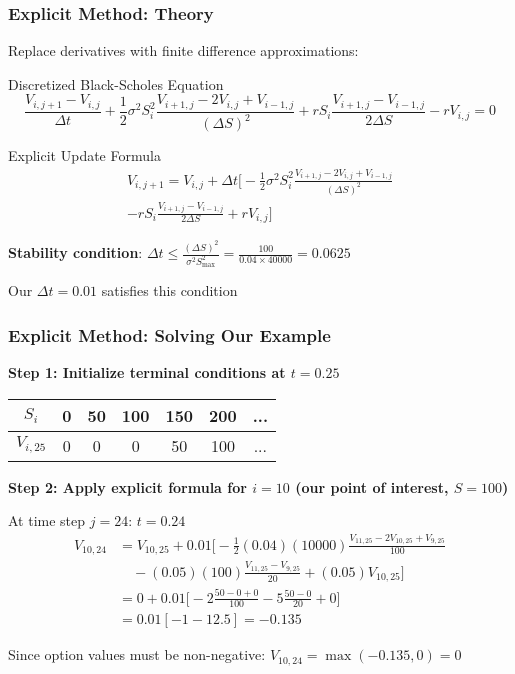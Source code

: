 \documentclass[aspectratio=169]{beamer}
\begin{document}
\begin{frame}
\frametitle{Explicit Method: Theory}
Replace derivatives with finite difference approximations:

\begin{block}{Discretized Black-Scholes Equation}
\[\frac{V_{i,j+1} - V_{i,j}}{\Delta t} + \frac{1}{2}\sigma^2 S_i^2 \frac{V_{i+1,j} - 2V_{i,j} + V_{i-1,j}}{(\Delta S)^2} + rS_i \frac{V_{i+1,j} - V_{i-1,j}}{2\Delta S} - rV_{i,j} = 0\]
\end{block}

\begin{block}{Explicit Update Formula}
\begin{multline}
V_{i,j+1} = V_{i,j} + \Delta t \bigg[ -\frac{1}{2}\sigma^2 S_i^2 \frac{V_{i+1,j} - 2V_{i,j} + V_{i-1,j}}{(\Delta S)^2} \\
- rS_i \frac{V_{i+1,j} - V_{i-1,j}}{2\Delta S} + rV_{i,j} \bigg]
\end{multline}
\end{block}

\textbf{Stability condition}: \(\Delta t \leq \frac{(\Delta S)^2}{\sigma^2 S_{\max}^2} = \frac{100}{0.04 \times 40000} = 0.0625\)

Our \(\Delta t = 0.01\) satisfies this condition \checkmark
\end{frame}

\begin{frame}
\frametitle{Explicit Method: Solving Our Example}
\textbf{Step 1: Initialize terminal conditions at \(t = 0.25\)}
\begin{center}
\begin{tabular}{c|c|c|c|c|c|c}
\(S_i\) & 0 & 50 & 100 & 150 & 200 & ... \\
\hline
\(V_{i,25}\) & 0 & 0 & 0 & 50 & 100 & ...
\end{tabular}
\end{center}

\textbf{Step 2: Apply explicit formula for \(i = 10\) (our point of interest, \(S = 100\))}

At time step \(j = 24\): \(t = 0.24\)
\begin{align}
V_{10,24} &= V_{10,25} + 0.01 \bigg[ -\frac{1}{2}(0.04)(10000) \frac{V_{11,25} - 2V_{10,25} + V_{9,25}}{100} \\
&\quad - (0.05)(100) \frac{V_{11,25} - V_{9,25}}{20} + (0.05)V_{10,25} \bigg] \\
&= 0 + 0.01 \bigg[ -2 \frac{50 - 0 + 0}{100} - 5 \frac{50 - 0}{20} + 0 \bigg] \\
&= 0.01[-1 - 12.5] = -0.135
\end{align}

Since option values must be non-negative: \(V_{10,24} = \max(-0.135, 0) = 0\)
\end{frame}
\end{document}
